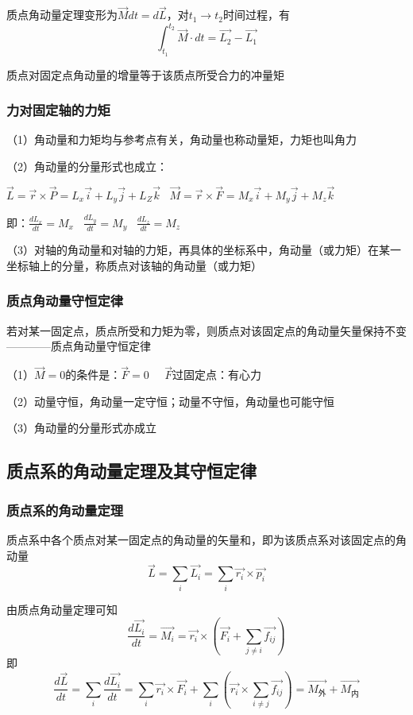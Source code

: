 \documentclass[UTF8]{article}
\begin{document}
    质点角动量定理变形为$\vec{M}dt = d\vec{L}$，对$t_1\rightarrow t_2$时间过程，有
    \[\int_{t_1}^{t_2}\vec{M}\cdot dt = \vec{L_2} - \vec{L_1}\]

    质点对固定点角动量的增量等于该质点所受合力的冲量矩

\subsubsection{力对固定轴的力矩}

    （1）角动量和力矩均与参考点有关，角动量也称动量矩，力矩也叫角力

    （2）角动量的分量形式也成立：
    
    $\vec{L} = \vec{r}\times\vec{P} = L_x\vec{i} + L_y\vec{j} + L_Z\vec{k}\;\;\;\vec{M} = \vec{r}\times\vec{F} = M_x\vec{i} + M_y\vec{j} + M_z\vec{k}$

    即：$\frac{dL_x}{dt} = M_x\;\;\;\frac{dL_y}{dt} = M_y\;\;\;\frac{dL_z}{dt} = M_z$

    （3）对轴的角动量和对轴的力矩，再具体的坐标系中，角动量（或力矩）在某一坐标轴上的分量，称质点对该轴的角动量（或力矩）

\subsubsection{质点角动量守恒定律}

    若对某一固定点，质点所受和力矩为零，则质点对该固定点的角动量矢量保持不变————质点角动量守恒定律

    （1）$\vec{M} = 0$的条件是：$\vec{F} = 0\;\;\;\;\;\vec{F}$过固定点：有心力

    （2）动量守恒，角动量一定守恒；动量不守恒，角动量也可能守恒

    （3）角动量的分量形式亦成立

\subsection{质点系的角动量定理及其守恒定律}
\subsubsection{质点系的角动量定理}

    质点系中各个质点对某一固定点的角动量的矢量和，即为该质点系对该固定点的角动量\[\vec{L} = \sum_i\vec{L_i} = \sum_i\vec{r_i}\times\vec{p_i}\]

    由质点角动量定理可知\[\frac{d\vec{L_i}}{dt} = \vec{M_i} = \vec{r_i}\times(\vec{F_i}+\sum_{j\neq i}\vec{f_{ij}})\]即\[\frac{d\vec{L}}{dt} = \sum_i\frac{d\vec{L_i}}{dt} = \sum_i\vec{r_i}\times\vec{F_i} + \sum_i(\vec{r_i}\times\sum_{i\neq j}\vec{f_{ij}}) = \vec{M_{\mbox{外}}} + \vec{M_{\mbox{内}}}\]
\end{document}
